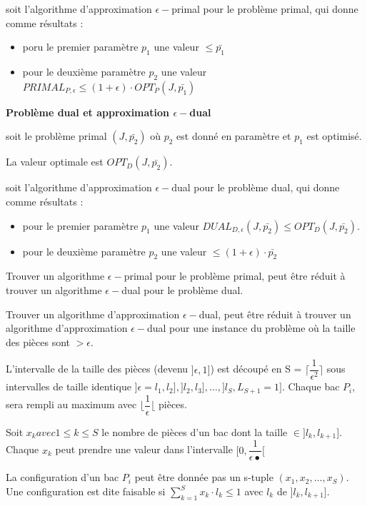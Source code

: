\documentclass[a4paper,12pt]{report}
\theoremstyle{plain}				%
\theoremstyle{definition}				%
\begin{document}
soit l'algorithme d'approximation $\epsilon-$primal pour le problème primal, qui donne comme résultats :

\begin{itemize}
\item poru le premier paramètre $p_1$ une valeur $\le \bar{p_1}$  
\item pour le deuxième paramètre $p_2$ une valeur $PRIMAL_{P,\epsilon} \le (1+\epsilon)\cdot OPT_P(J,\bar{p_1})$
\end{itemize}
\bigskip

\textbf{Problème dual et approximation $\epsilon-$dual}

soit le problème primal $(J,\bar{p_2})$
où $p_2$ est donné en paramètre et $p_1$ est optimisé.

La valeur optimale est $OPT_D(J,\bar{p_2})$.

soit l'algorithme d'approximation $\epsilon-$dual pour le problème dual, qui donne comme résultats :

\begin{itemize}
\item pour le premier paramètre $p_1$ une valeur $DUAL_{D,\epsilon}(J, \bar{p_2})\le OPT_D(J,\bar{p_2})$.  
\item pour le deuxième paramètre $p_2$ une valeur $ \le (1+\epsilon)\cdot \bar{p_2}$
\end{itemize}

\bigskip

Trouver un algorithme $\epsilon-$primal pour le problème primal, 
peut être réduit à trouver un algorithme $\epsilon-$dual pour le problème dual.

Trouver un algorithme d'approximation $\epsilon-$dual, peut être réduit à trouver un algorithme 
d'approximation $\epsilon-$dual pour une instance du problème où la taille des pièces sont $> \epsilon$. 

\bigskip
L'intervalle de la taille des pièces (devenu $]\epsilon, 1]$) est découpé en S = $\lceil \dfrac{1}{\epsilon^2}\rceil$ sous intervalles de taille identique $]\epsilon = l_1, l_2], ]l_2, l_3], \ldots , ]l_S, L_{S+1}=1]$.
Chaque bac $P_i$, sera rempli au maximum avec $\lfloor \dfrac{1}{\epsilon} \lfloor$ pièces.

Soit $x_k avec 1 \le k \le S$ le nombre de pièces d'un bac dont la taille $\in ]l_k, l_{k+1}]$. Chaque $x_k$ peut prendre une valeur dans l'intervalle $[0,\dfrac{1}{\epsilon•}[$

La configuration d'un bac $P_i$ peut être donnée pas un s-tuple $(x_1, x_2, \ldots, x_S)$.
Une configuration est dite faisable si $\sum_{k=1}^{S}x_k \cdot l_k \le 1$ avec $l_k$ de $]l_k, l_{k+1}]$.
\end{document}
